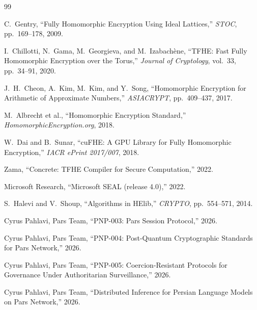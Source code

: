 \documentclass[11pt,a4paper]{article}
\begin{document}
\begin{thebibliography}{99}

C.~Gentry,
``Fully Homomorphic Encryption Using Ideal Lattices,''
\emph{STOC}, pp.~169--178, 2009.

I.~Chillotti, N.~Gama, M.~Georgieva, and M.~Izabach\`{e}ne,
``TFHE: Fast Fully Homomorphic Encryption over the Torus,''
\emph{Journal of Cryptology}, vol.~33, pp.~34--91, 2020.

J.~H.~Cheon, A.~Kim, M.~Kim, and Y.~Song,
``Homomorphic Encryption for Arithmetic of Approximate Numbers,''
\emph{ASIACRYPT}, pp.~409--437, 2017.

M.~Albrecht et al.,
``Homomorphic Encryption Standard,''
\emph{HomomorphicEncryption.org}, 2018.

W.~Dai and B.~Sunar,
``cuFHE: A GPU Library for Fully Homomorphic Encryption,''
\emph{IACR ePrint 2017/007}, 2018.

Zama,
``Concrete: TFHE Compiler for Secure Computation,''
2022.

Microsoft Research,
``Microsoft SEAL (release 4.0),''
2022.

S.~Halevi and V.~Shoup,
``Algorithms in HElib,''
\emph{CRYPTO}, pp.~554--571, 2014.

Cyrus Pahlavi, Pars Team,
``PNP-003: Pars Session Protocol,''
2026.

Cyrus Pahlavi, Pars Team,
``PNP-004: Post-Quantum Cryptographic Standards for Pars Network,''
2026.

Cyrus Pahlavi, Pars Team,
``PNP-005: Coercion-Resistant Protocols for Governance Under
Authoritarian Surveillance,''
2026.

Cyrus Pahlavi, Pars Team,
``Distributed Inference for Persian Language Models on Pars Network,''
2026.

\end{thebibliography}
\end{document}
